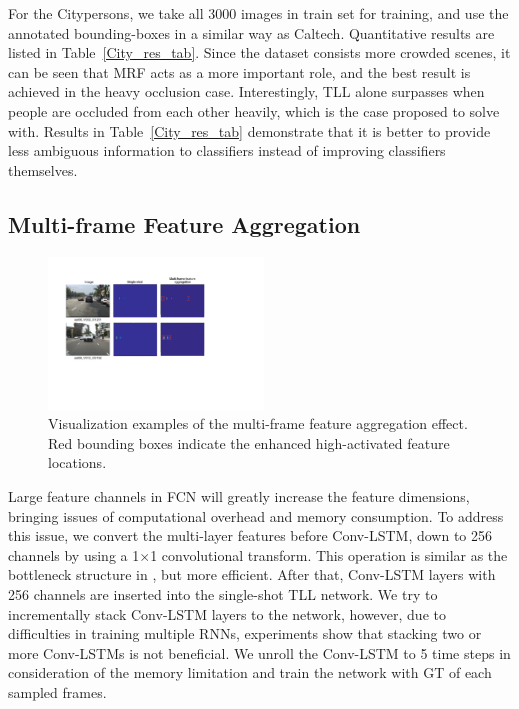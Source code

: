 \documentclass[runningheads]{llncs}
\begin{document}
For the Citypersons, we take all 3000 images in train set for training, and use the annotated bounding-boxes in a similar way as Caltech. Quantitative results are listed in Table~\ref{City_res_tab}. Since the dataset consists more crowded scenes, it can be seen that MRF acts as a more important role, and the best result is achieved in the heavy occlusion case. Interestingly, TLL alone surpasses \cite{RLoss} when people are occluded from each other heavily, which is the case \cite{RLoss} proposed to solve with. Results in Table~\ref{City_res_tab} demonstrate that it is better to provide less ambiguous information to classifiers instead of improving classifiers themselves.
\subsection{Multi-frame Feature Aggregation}
\begin{figure}[t]
	\centering
	\includegraphics[height=4.05cm]{8_aggregation.pdf}
	\caption{Visualization examples of the multi-frame feature aggregation effect. Red bounding boxes indicate the enhanced high-activated feature locations.}
	\label{fig8}
\end{figure}

Large feature channels in FCN will greatly increase the feature dimensions, bringing issues of computational overhead and memory consumption. To address this issue, we convert the multi-layer features before Conv-LSTM, down to 256 channels by using a 1$\times$1 convolutional transform. This operation is similar as the bottleneck structure in \cite{VOD}, but more efficient. After that, Conv-LSTM layers with 256 channels are inserted into the single-shot TLL network. We try to incrementally stack Conv-LSTM layers to the network, however, due to difficulties in training multiple RNNs, experiments show that stacking two or more Conv-LSTMs is not beneficial. We unroll the Conv-LSTM to 5 time steps in consideration of the memory limitation and train the network with GT of each sampled frames.
\end{document}
